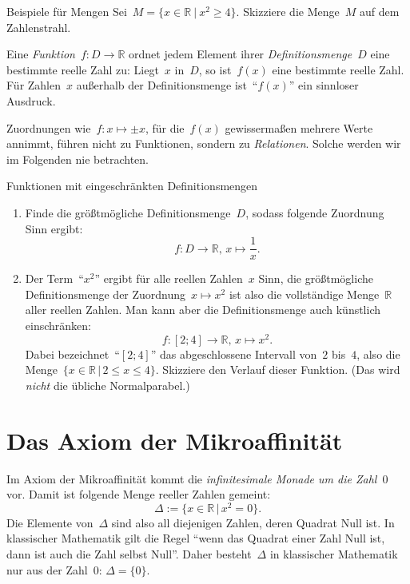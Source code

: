 \documentclass[twoside]{../zirkelblatt}
\newcommand{\RR}{\mathbb{R}}
\theoremstyle{definition}
\theoremstyle{plain}
\theoremstyle{remark}
\begin{document}
\begin{aufgabeShaded}{Beispiele für Mengen}
Sei~$M = \{ x \in \RR \ |\ x^2 \geq 4 \}$. Skizziere die Menge~$M$ auf dem
Zahlenstrahl.
\end{aufgabeShaded}

Eine \emph{Funktion}~$f : D \to \RR$ ordnet jedem Element ihrer
\emph{Definitionsmenge}~$D$ eine bestimmte reelle Zahl zu: Liegt~$x$ in~$D$, so
ist~$f(x)$ eine bestimmte reelle Zahl. Für Zahlen~$x$ außerhalb der
Definitionsmenge ist~"`$f(x)$"' ein sinnloser Ausdruck.

Zuordnungen wie~$f : x \mapsto \pm x$, für die~$f(x)$ gewissermaßen
mehrere Werte annimmt, führen nicht zu Funktionen, sondern zu \emph{Relationen}.
Solche werden wir im Folgenden nie betrachten.

\begin{aufgabeShaded}{Funktionen mit eingeschränkten Definitionsmengen}
\begin{enumerate}
\item Finde die größtmögliche Definitionsmenge~$D$, sodass folgende Zuordnung
Sinn ergibt:
\[ f : D \to \RR,\,x \mapsto \frac{1}{x}. \]
\item Der Term~"`$x^2$"' ergibt für alle reellen Zahlen~$x$ Sinn, die
größtmögliche Definitionsmenge der Zuordnung~$x \mapsto x^2$ ist also die
vollständige Menge~$\RR$ aller reellen Zahlen. Man kann aber die
Definitionsmenge auch künstlich einschränken:
\[ f : [2;4] \to \RR,\,x \mapsto x^2. \]
Dabei bezeichnet~"`$[2;4]$"' das abgeschlossene Intervall von~$2$ bis~$4$, also
die Menge~$\{ x \in \RR \,|\, 2 \leq x \leq 4 \}$. Skizziere den Verlauf dieser
Funktion. (Das wird \emph{nicht} die übliche Normalparabel.)
\end{enumerate}
\end{aufgabeShaded}


\section{Das Axiom der Mikroaffinität}

Im Axiom der Mikroaffinität kommt die \emph{infinitesimale Monade um die
Zahl~$0$} vor. Damit ist folgende Menge reeller Zahlen gemeint:
\[ \Delta := \{ x \in \RR \,|\, x^2 = 0 \}. \]
Die Elemente von~$\Delta$ sind also all diejenigen Zahlen, deren Quadrat Null
ist. In klassischer Mathematik gilt die Regel "`wenn das Quadrat einer Zahl
Null ist, dann ist auch die Zahl selbst Null"'. Daher besteht~$\Delta$ in klassischer
Mathematik nur aus der Zahl~$0$: $\Delta = \{ 0 \}$.
\end{document}
